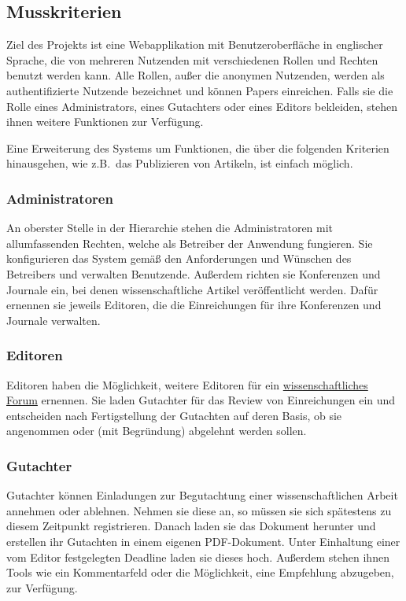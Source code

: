 
\subsection{Musskriterien}
Ziel des Projekts ist eine Webapplikation mit Benutzeroberfläche in englischer Sprache, die von mehreren Nutzenden mit verschiedenen Rollen und Rechten benutzt werden kann.
Alle Rollen, außer die anonymen Nutzenden, werden als authentifizierte Nutzende bezeichnet und können Papers einreichen.
Falls sie die Rolle eines Administrators, eines Gutachters oder eines Editors bekleiden, stehen ihnen weitere Funktionen zur Verfügung.

Eine Erweiterung des Systems um Funktionen, die über die folgenden Kriterien hinausgehen, wie z.B.\ das Publizieren von Artikeln, ist einfach möglich.

\subsubsection{Administratoren}\label{mkrit:admin}
An oberster Stelle in der Hierarchie stehen die Administratoren mit allumfassenden Rechten, welche als Betreiber der Anwendung fungieren.
Sie konfigurieren das System gemäß den Anforderungen und Wünschen des Betreibers und verwalten Benutzende.
Außerdem richten sie Konferenzen und Journale ein, bei denen wissenschaftliche Artikel veröffentlicht werden.
Dafür ernennen sie jeweils Editoren, die die Einreichungen für ihre Konferenzen und Journale verwalten.

\subsubsection{Editoren}\label{mkrit:editor}
Editoren haben die Möglichkeit, weitere Editoren für ein \hyperref[glo:wissForum]{wissenschaftliches Forum} ernennen.
Sie laden Gutachter für das Review von Einreichungen ein und entscheiden nach Fertigstellung der Gutachten auf deren Basis, ob sie angenommen oder (mit Begründung) abgelehnt werden sollen.

\subsubsection{Gutachter}\label{mkrit:gutachter}
Gutachter können Einladungen zur Begutachtung einer wissenschaftlichen Arbeit annehmen oder ablehnen.
Nehmen sie diese an, so müssen sie sich spätestens zu diesem Zeitpunkt registrieren.
Danach laden sie das Dokument herunter und erstellen ihr Gutachten in einem eigenen PDF-Dokument.
Unter Einhaltung einer vom Editor festgelegten Deadline laden sie dieses hoch.
Außerdem stehen ihnen Tools wie ein Kommentarfeld oder die Möglichkeit, eine Empfehlung abzugeben, zur Verfügung.


